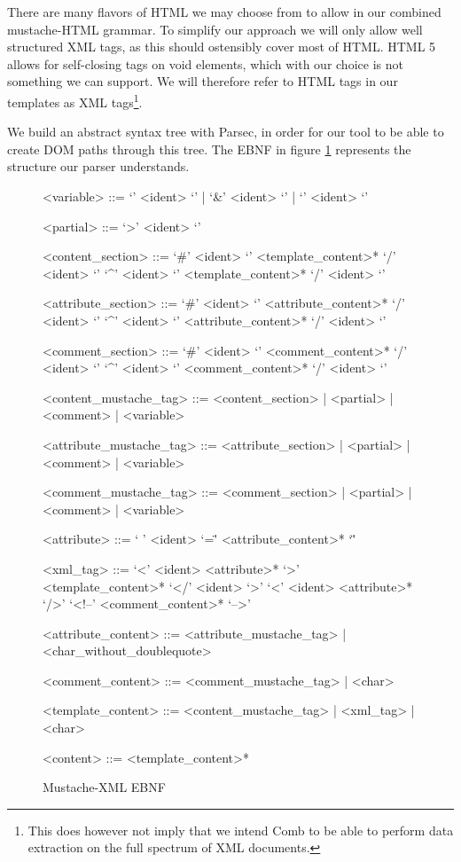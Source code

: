 \documentclass[thesis.tex]{subfiles}
\begin{document}
There are many flavors of HTML we may choose from to allow in our
combined mustache-HTML grammar. To simplify our approach we will only allow well
structured XML tags, as this should ostensibly cover most of HTML.
HTML 5 allows for self-closing tags on void elements, which with our choice is
not something we can support. We will therefore refer to HTML tags in our
templates as XML tags\footnote{
	This does however not imply that we intend Comb to be able to perform data
	extraction on the full spectrum of XML documents.
}.

We build an abstract syntax tree with Parsec, in order for our tool to be
able to create DOM paths through this tree.
The EBNF in figure \ref{fig:mustache-xml.ebnf} represents the structure our
parser understands.

\begin{figure}
	\centering
	\setlength{\grammarindent}{4.2cm}
	\begin{grammar}
<variable> ::= `{{{' <ident> `}}}' | `{{&' <ident> `}}' | `{{' <ident> `}}'

<partial> ::= `{{>' <ident> `}}'

<content\_section> ::= `{{#' <ident> `}}' <template\_content>* `{{/' <ident> `}}'
                  \alt `{{^' <ident> `}}' <template\_content>* `{{/' <ident> `}}'

<attribute\_section> ::= `{{#' <ident> `}}' <attribute\_content>* `{{/' <ident> `}}'
                    \alt `{{^' <ident> `}}' <attribute\_content>* `{{/' <ident> `}}'

<comment\_section> ::= `{{\#' <ident> `}}' <comment\_content>* `{{/' <ident> `}}'
                  \alt `{{^' <ident> `}}' <comment\_content>* `{{/' <ident> `}}'

<content\_mustache\_tag> ::= <content\_section> | <partial> | <comment> | <variable>

<attribute\_mustache\_tag> ::= <attribute\_section> | <partial> | <comment> | <variable>

<comment\_mustache\_tag> ::= <comment\_section> | <partial> | <comment> | <variable>

<attribute> ::= ` ' <ident> `=\"' <attribute\_content>* `\"' 

<xml\_tag> ::= `<' <ident> <attribute>* `>' <template\_content>* `</' <ident> `>'
          \alt `<' <ident> <attribute>* `/>'
          \alt `<!--' <comment\_content>* `-->'

<attribute\_content> ::= <attribute\_mustache\_tag> | <char\_without\_doublequote>

<comment\_content> ::= <comment\_mustache\_tag> | <char>

<template\_content> ::= <content\_mustache\_tag> | <xml\_tag> | <char>

<content> ::= <template\_content>*
	\end{grammar}
	\caption{Mustache-XML EBNF}
	\label{fig:mustache-xml.ebnf}
\end{figure}
\end{document}
